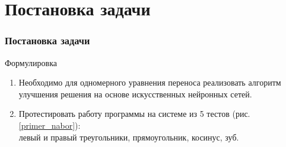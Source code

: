 \documentclass{beamer}
\begin{document}
\section{Постановка задачи}
\begin{frame}
\frametitle{Постановка задачи}
\begin{block}{Формулировка}
\begin{enumerate}
	\item Необходимо для одномерного уравнения переноса реализовать алгоритм улучшения решения на основе искусственных нейронных сетей.
	\item  Протестировать работу программы на системе из 5 тестов (рис.\ref{primer_nabor}):\\ левый и правый треугольники, прямоугольник, косинус, зуб. \hyperlink{pril1}{}
	 
\end{enumerate}
\end{block}


\end{frame}
\end{document}
